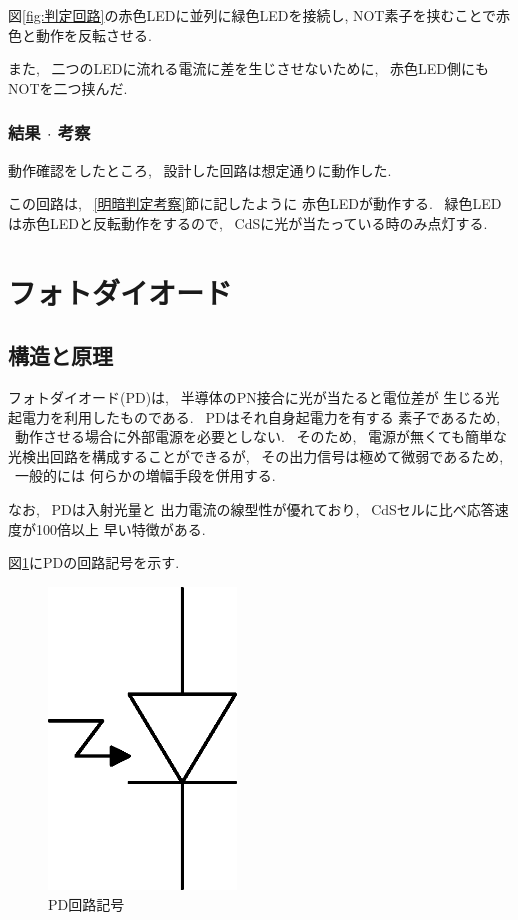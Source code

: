 \documentclass[titlepage]{jsarticle}
\begin{document}
            図\ref{fig:判定回路}の赤色LEDに並列に緑色LEDを接続し,
            NOT素子を挟むことで赤色と動作を反転させる.

            また, ~二つのLEDに流れる電流に差を生じさせないために,
            ~赤色LED側にもNOTを二つ挟んだ.
        
        \subsubsection{結果 $\cdot$ 考察}
            動作確認をしたところ, ~設計した回路は想定通りに動作した.
            
            この回路は, ~\ref{明暗判定考察}節に記したように
            赤色LEDが動作する. ~緑色LEDは赤色LEDと反転動作をするので,
            ~CdSに光が当たっている時のみ点灯する.

\section{フォトダイオード}
    \subsection{構造と原理} \label{フォトダイオード構造と原理}
        フォトダイオード(PD)は, ~半導体のPN接合に光が当たると電位差が
        生じる光起電力を利用したものである. ~PDはそれ自身起電力を有する
        素子であるため, ~動作させる場合に外部電源を必要としない.
        ~そのため, ~電源が無くても簡単な光検出回路を構成することができるが,
        ~その出力信号は極めて微弱であるため, ~一般的には
        何らかの増幅手段を併用する.
        
        なお, ~PDは入射光量と
        出力電流の線型性が優れており, ~CdSセルに比べ応答速度が100倍以上
        早い特徴がある.
        
        図\ref{fig:PD}にPDの回路記号を示す.

        \begin{figure}[ht]
            \centering
            \includegraphics[width=5cm]{images/pd.eps}
            \caption{PD回路記号}
            \label{fig:PD}
        \end{figure}
\end{document}

